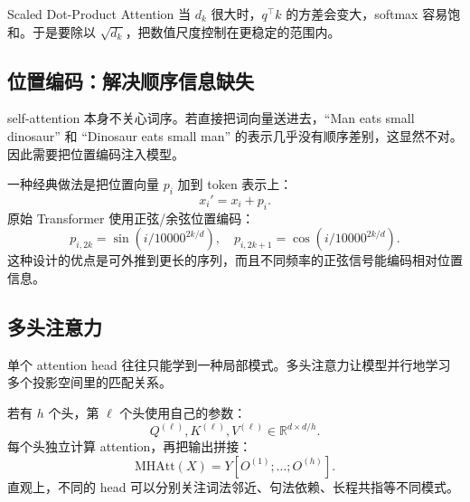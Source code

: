 \documentclass[a4paper]{article}
\begin{document}
\begin{knowledgebox}{Scaled Dot-Product Attention}
当 $d_k$ 很大时，$q^\top k$ 的方差会变大，softmax 容易饱和。于是要除以 $\sqrt{d_k}$，把数值尺度控制在更稳定的范围内。
\end{knowledgebox}













\subsection{位置编码：解决顺序信息缺失}

self-attention 本身不关心词序。若直接把词向量送进去，``Man eats small dinosaur'' 和 ``Dinosaur eats small man'' 的表示几乎没有顺序差别，这显然不对。因此需要把位置编码注入模型。





一种经典做法是把位置向量 $p_i$ 加到 token 表示上：
\[
x_i' = x_i + p_i.
\]
原始 Transformer 使用正弦/余弦位置编码：
\[
p_{i,2k} = \sin\!\left(i / 10000^{2k/d}\right), \quad
p_{i,2k+1} = \cos\!\left(i / 10000^{2k/d}\right).
\]
这种设计的优点是可外推到更长的序列，而且不同频率的正弦信号能编码相对位置信息。









\subsection{多头注意力}

单个 attention head 往往只能学到一种局部模式。多头注意力让模型并行地学习多个投影空间里的匹配关系。





若有 $h$ 个头，第 $\ell$ 个头使用自己的参数：
\[
Q^{(\ell)}, K^{(\ell)}, V^{(\ell)} \in \mathbb{R}^{d \times d/h}.
\]
每个头独立计算 attention，再把输出拼接：
\[
\mathrm{MHAtt}(X) = Y [O^{(1)}; \dots; O^{(h)}].
\]
直观上，不同的 head 可以分别关注词法邻近、句法依赖、长程共指等不同模式。
\end{document}
